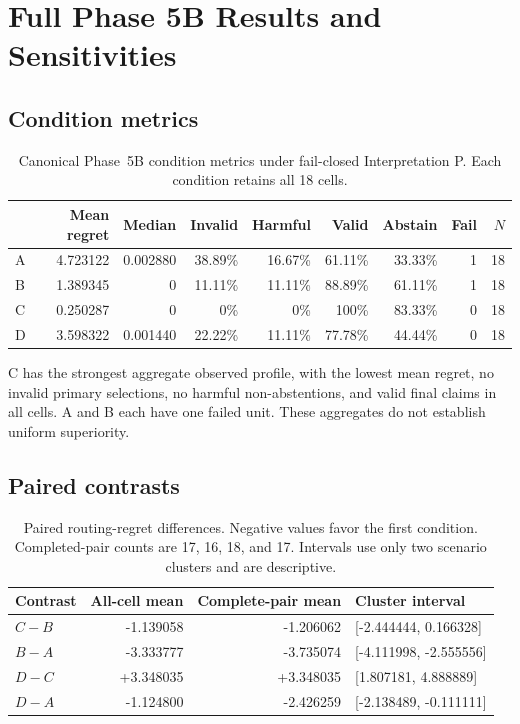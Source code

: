 \section{Full Phase 5B Results and Sensitivities}
\label{supp:results}

\subsection{Condition metrics}

\begin{table}[t]
\centering
\begin{tabular}{@{}lrrrrrrrr@{}}
\toprule
 & Mean regret & Median & Invalid & Harmful & Valid & Abstain & Fail & \(N\) \\
\midrule
A & 4.723122 & 0.002880 & 38.89\% & 16.67\% & 61.11\% & 33.33\% & 1 & 18 \\
B & 1.389345 & 0 & 11.11\% & 11.11\% & 88.89\% & 61.11\% & 1 & 18 \\
C & 0.250287 & 0 & 0\% & 0\% & 100\% & 83.33\% & 0 & 18 \\
D & 3.598322 & 0.001440 & 22.22\% & 11.11\% & 77.78\% & 44.44\% & 0 & 18 \\
\bottomrule
\end{tabular}
\caption{Canonical Phase~5B condition metrics under fail-closed
Interpretation P.  Each condition retains all 18 cells.}
\end{table}

C has the strongest aggregate observed profile, with the lowest mean regret,
no invalid primary selections, no harmful non-abstentions, and valid final
claims in all cells.  A and B each have one failed unit.  These aggregates do
not establish uniform superiority.

\subsection{Paired contrasts}

\begin{table}[t]
\centering
\begin{tabular}{@{}lrrl@{}}
\toprule
Contrast & All-cell mean & Complete-pair mean & Cluster interval \\
\midrule
\(C-B\) & -1.139058 & -1.206062 & [-2.444444, 0.166328] \\
\(B-A\) & -3.333777 & -3.735074 & [-4.111998, -2.555556] \\
\(D-C\) & +3.348035 & +3.348035 & [1.807181, 4.888889] \\
\(D-A\) & -1.124800 & -2.426259 & [-2.138489, -0.111111] \\
\bottomrule
\end{tabular}
\caption{Paired routing-regret differences.  Negative values favor the first
condition.  Completed-pair counts are 17, 16, 18, and 17.  Intervals use only
two scenario clusters and are descriptive.}
\end{table}

